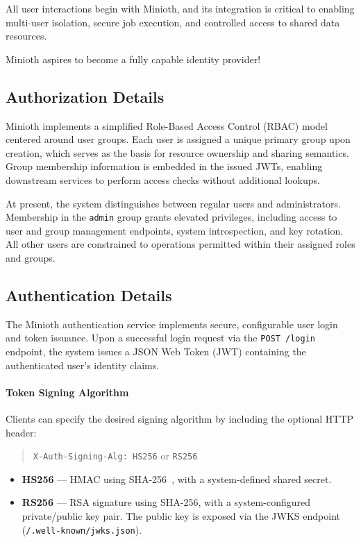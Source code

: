 All user interactions begin with Minioth, and its integration is critical to enabling multi-user isolation, secure job execution, and 
controlled access to shared data resources.

Minioth aspires to become a fully capable identity provider!

\subsection{Authorization Details}

Minioth implements a simplified Role-Based Access Control (RBAC) model centered around user groups. Each user is assigned a unique primary group upon creation, which serves as the basis for resource ownership and sharing semantics. Group membership information is embedded in the issued JWTs, enabling downstream services to perform access checks without additional lookups.

At present, the system distinguishes between regular users and administrators. Membership in the \texttt{admin} group grants elevated privileges, including access to user and group management endpoints, system introspection, and key rotation. All other users are constrained to operations permitted within their assigned roles and groups.

\subsection{Authentication Details}

The Minioth authentication service implements secure, configurable user login and token issuance. Upon a successful login request via the \texttt{POST /login} endpoint, the system issues a JSON Web Token (JWT) containing the authenticated user's identity claims.

\paragraph{Token Signing Algorithm}
Clients can specify the desired signing algorithm by including the optional HTTP header:

\begin{quote}
\texttt{X-Auth-Signing-Alg: HS256} \quad or \quad \texttt{RS256}~\cite{jose-algorithms}
\end{quote}

\begin{itemize}
  \item \textbf{HS256} — HMAC using SHA-256~\cite{sha256-rfc6234}, with a system-defined shared secret.
  \item \textbf{RS256} — RSA signature using SHA-256, with a system-configured private/public key pair. 
  The public key is exposed via the JWKS endpoint (\texttt{/.well-known/jwks.json}).
\end{itemize}


